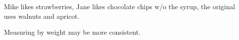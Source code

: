 \begin{variation}
\item Mike likes strawberries, Jane likes chocolate chips w/o the syrup, the original~\cite{joyofcooking2006} uses walnuts and apricot.
\end{variation}


\begin{experiments}
\item Measuring by weight may be more consistent.
\end{experiments}


\recipeend%
